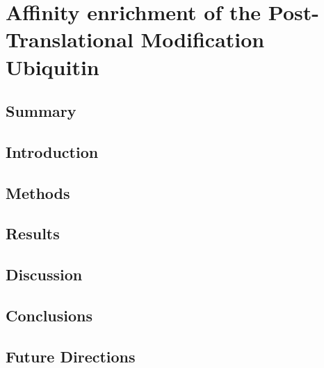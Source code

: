 \chapter{Affinity enrichment of the Post-Translational Modification Ubiquitin}

\section{Summary}

\section{Introduction}

\section{Methods}

\section{Results}

\section{Discussion}

\section{Conclusions}

\section{Future Directions}